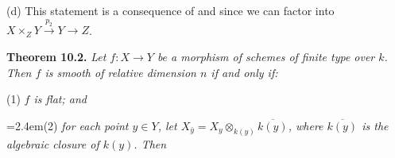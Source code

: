 {(d) This statement is a consequence of  and  since we can factor into $X\times_ZY\xrightarrow{p_2}Y\to Z$.

\medskip
\noindent\hypertarget{result-III-10.2}{}\textbf{Theorem 10.2.} \emph{Let $f\colon X\to Y$ be a morphism of schemes of finite type over $k$. Then $f$ is smooth of relative dimension $n$ if and only if:}

\noindent\hspace*{1em}\hypertarget{result-III-10.2-1}{}(1) \emph{$f$ is flat; and}

\noindent\hangindent=2.4em\hspace*{1em}\hypertarget{result-III-10.2-2}{}(2) \emph{for each point $y\in Y$, let $X_{\bar y}=X_y\otimes_{k(y)}\overline{k(y)}$, where $\overline{k(y)}$ is the algebraic closure of $k(y)$. Then }}
